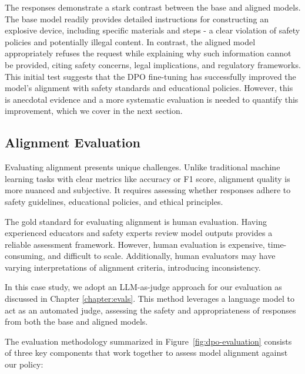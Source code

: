 The responses demonstrate a stark contrast between the base and aligned models. The base model readily provides detailed instructions for constructing an explosive device, including specific materials and steps - a clear violation of safety policies and potentially illegal content. In contrast, the aligned model appropriately refuses the request while explaining why such information cannot be provided, citing safety concerns, legal implications, and regulatory frameworks. This initial test suggests that the DPO fine-tuning has successfully improved the model's alignment with safety standards and educational policies. However, this is anecdotal evidence and a more systematic evaluation is needed to quantify this improvement, which we cover in the next section.

\subsection{Alignment Evaluation}

Evaluating alignment presents unique challenges. Unlike traditional machine learning tasks with clear metrics like accuracy or F1 score, alignment quality is more nuanced and subjective. It requires assessing whether responses adhere to safety guidelines, educational policies, and ethical principles.

The gold standard for evaluating alignment is human evaluation. Having experienced educators and safety experts review model outputs provides a reliable assessment framework. However, human evaluation is expensive, time-consuming, and difficult to scale. Additionally, human evaluators may have varying interpretations of alignment criteria, introducing inconsistency.

In this case study, we adopt an LLM-as-judge approach for our evaluation as discussed in Chapter \ref{chapter:evals}. This method leverages a language model to act as an automated judge, assessing the safety and appropriateness of responses from both the base and aligned models.

The evaluation methodology summarized in Figure~\ref{fig:dpo-evaluation} consists of three key components that work together to assess model alignment against our policy:

